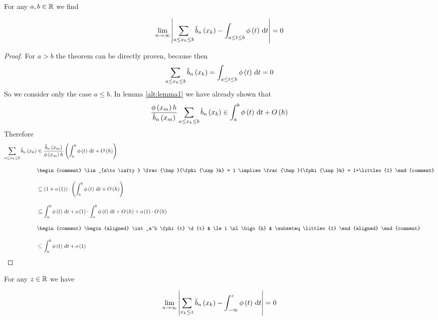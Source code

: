 \begin{theorem}
  For any $a,b\in\mathbb R$ we find

  \begin{align}
    \lim_{n\to\infty} \left|{\sum_{a \le x_{k} \le b} \tilde b_{n}\left({x_{k}}\right) - \int_{a \le t \le b} \phi\left( {t} \right) \,\mathrm d{t} }\right| = 0
  \end{align}
\end{theorem}

\begin{proof}
  For $a > b$ the theorem can be directly proven, because then
  \begin{align}
    \sum_{a \le x_{k} \le b} \tilde b_{n}\left({x_{k}}\right) = \int_{a \le t \le b} \phi\left( {t} \right) \,\mathrm d{t} = 0
  \end{align}
  So we consider only the case $a\le b$. In lemma \ref{alt:lemma1} we have already shown that
  \begin{align}
    \frac{\phi\left( {x_{m}} \right)h}{\tilde b_{n}\left({x_{m}}\right)} \sum_{a\le x_{k} \le b} \tilde b_{n}\left({x_{k}}\right) \in \int_a^b \phi\left( {t} \right) \,\mathrm d{t} + O\left( {h} \right)
  \end{align}
  Therefore
  \begin{align}
    \sum_{a\le \x \le b} \bb{\x} & \in \frac{\bnp}{\fphi{\xnp}h} \br{\int_a^b \fphi{t} \d{t} + \bigo{h}} \bnl
    &
    \begin{comment}
      \lim_{n\to\infty} \frac{\bnp}{\fphi{\xnp}h} = 1 \implies \frac{\bnp}{\fphi{\xnp}h} = 1+\littleo{1}
    \end{comment} \bnl
    & \subseteq \br{1+\littleo{1}}\cdot \br{\int_a^b \fphi{t} \d{t} + \bigo{h}} \bnl
    & \subseteq \int_a^b \fphi{t}\d{t} + \littleo{1} \cdot \int_a^b \fphi{t} \d{t} + \bigo{h} + \littleo{1} \cdot \bigo{h} \bnl
    &
    \begin{comment}
      \begin{aligned}
        \int_a^b \fphi{t} \d{t} & \le 1 \nl
        \bigo{h} & \subseteq \littleo{1}
      \end{aligned}
    \end{comment} \bnl
    & \subseteq \int_a^b \fphi{t} \d{t} + \littleo{1}
  \end{align}
\end{proof}

\begin{theorem}
  For any $z\in\mathbb R$ we have

  \begin{align}
    \lim_{n\to\infty} \left|{\sum_{x_{k} \le z} \tilde b_{n}\left({x_{k}}\right) - \int_{-\infty}^z \phi\left( {t} \right)\,\mathrm d{t} }\right| = 0
  \end{align}
\end{theorem}

